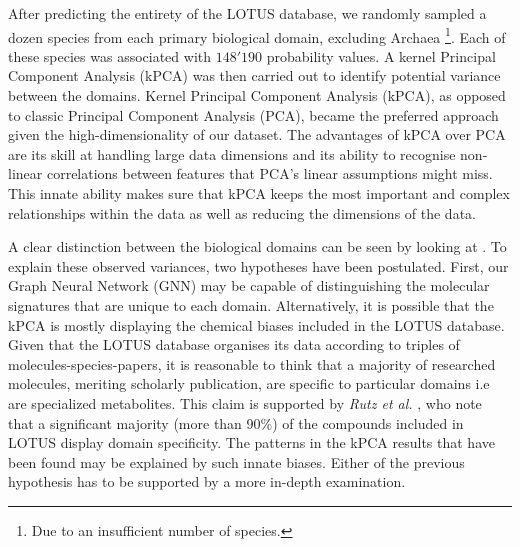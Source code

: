 \documentclass[
11pt, %
oneside, %
english, %
singlespacing, %
headsepline, %
chapterinoneline, %
]{MastersDoctoralThesis} %
\begin{document}
After predicting the entirety of the LOTUS database, we randomly sampled a dozen species from each primary biological domain, excluding Archaea \footnote{Due to an insufficient number of species.}. Each of these species was associated with $148'190$ probability values. A kernel Principal Component Analysis (kPCA) was then carried out to identify potential variance between the domains. Kernel Principal Component Analysis (kPCA), as opposed to classic Principal Component Analysis (PCA), became the preferred approach given the high-dimensionality of our dataset. The advantages of kPCA over PCA are its skill at handling large data dimensions and its ability to recognise non-linear correlations between features that PCA's linear assumptions might miss. This innate ability makes sure that kPCA keeps the most important and complex relationships within the data as well as reducing the dimensions of the data.

A clear distinction between the biological domains can be seen by looking at . To explain these observed variances, two hypotheses have been postulated. First, our  Graph Neural Network (GNN) may be capable of distinguishing the molecular signatures that are unique to each domain. Alternatively, it is possible that the kPCA is mostly displaying the chemical biases included in the LOTUS database. Given that the LOTUS database organises its data according to triples of molecules-species-papers, it is reasonable to think that a majority of  researched molecules, meriting scholarly publication, are specific to particular domains i.e are specialized metabolites. This claim is supported by \textit{Rutz et al.} \cite{rutzLOTUSInitiativeOpen2022}, who note that a significant majority (more than 90\%) of the compounds included in LOTUS display domain specificity. The patterns in the kPCA results that have been found may be explained by such innate biases. Either of the previous hypothesis has to be supported by a more in-depth examination.
 
\end{document}
